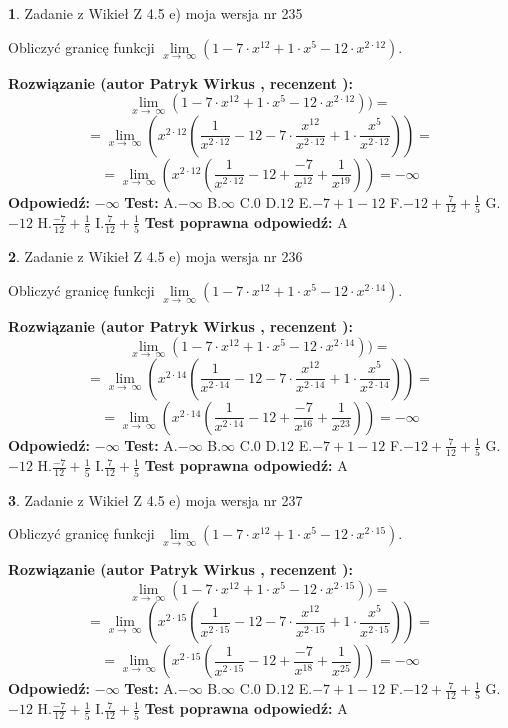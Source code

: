 \documentclass[12pt, a4paper]{article}
\theoremstyle{definition} %
\newtheorem{zad}{}
\newcommand{\zadStart}[1]{\begin{zad}#1\newline}
\newcommand{\zadStop}{\end{zad}}
\newcommand{\rozwStart}[2]{\noindent \textbf{Rozwiązanie (autor #1 , recenzent #2): }\newline}
\newcommand{\rozwStop}{\newline}
\newcommand{\odpStart}{\noindent \textbf{Odpowiedź:}\newline}
\newcommand{\odpStop}{\newline}
\newcommand{\testStart}{\noindent \textbf{Test:}\newline}
\newcommand{\testStop}{\newline}
\newcommand{\kluczStart}{\noindent \textbf{Test poprawna odpowiedź:}\newline}
\newcommand{\kluczStop}{\newline}
\begin{document}
\zadStart{Zadanie z Wikieł Z 4.5 e) moja wersja nr 235}



Obliczyć granicę funkcji  $\lim\limits_{x\to\ \infty}(1 - 7 \cdot x^{12}+1 \cdot x^{5}- 12 \cdot x^{2\cdot12})$.
\zadStop
\rozwStart{Patryk Wirkus}{}
$$\lim\limits_{x\to\ \infty}(1 - 7 \cdot x^{12}+1 \cdot x^{5}- 12 \cdot x^{2\cdot12}))=$$
$$=\lim\limits_{x\to\ \infty}(x^{2\cdot12}(\frac{1}{x^{2\cdot12}}-12 -7 \cdot \frac{x^{12}}{x^{2\cdot12}}+1 \cdot \frac{x^{5}}{x^{2\cdot12}}))=$$
$$=\lim\limits_{x\to\ \infty}(x^{2\cdot12}(\frac{1}{x^{2\cdot12}}-12 + \frac{-7}{x^{12}}+ \frac{1}{x^{19}}))=-\infty$$
\rozwStop
\odpStart
$-\infty$
\odpStop
\testStart
A.$-\infty$ B.$\infty$ C.$0$ D.$12$ E.$-7 + 1 - 12$
F.$-12+\frac{7}{12}+\frac{1}{5}$ G.$-12$
H.$\frac{-7}{12}+\frac{1}{5}$
I.$\frac{7}{12}+\frac{1}{5}$
\testStop
\kluczStart
A
\kluczStop



\zadStart{Zadanie z Wikieł Z 4.5 e) moja wersja nr 236}



Obliczyć granicę funkcji  $\lim\limits_{x\to\ \infty}(1 - 7 \cdot x^{12}+1 \cdot x^{5}- 12 \cdot x^{2\cdot14})$.
\zadStop
\rozwStart{Patryk Wirkus}{}
$$\lim\limits_{x\to\ \infty}(1 - 7 \cdot x^{12}+1 \cdot x^{5}- 12 \cdot x^{2\cdot14}))=$$
$$=\lim\limits_{x\to\ \infty}(x^{2\cdot14}(\frac{1}{x^{2\cdot14}}-12 -7 \cdot \frac{x^{12}}{x^{2\cdot14}}+1 \cdot \frac{x^{5}}{x^{2\cdot14}}))=$$
$$=\lim\limits_{x\to\ \infty}(x^{2\cdot14}(\frac{1}{x^{2\cdot14}}-12 + \frac{-7}{x^{16}}+ \frac{1}{x^{23}}))=-\infty$$
\rozwStop
\odpStart
$-\infty$
\odpStop
\testStart
A.$-\infty$ B.$\infty$ C.$0$ D.$12$ E.$-7 + 1 - 12$
F.$-12+\frac{7}{12}+\frac{1}{5}$ G.$-12$
H.$\frac{-7}{12}+\frac{1}{5}$
I.$\frac{7}{12}+\frac{1}{5}$
\testStop
\kluczStart
A
\kluczStop



\zadStart{Zadanie z Wikieł Z 4.5 e) moja wersja nr 237}



Obliczyć granicę funkcji  $\lim\limits_{x\to\ \infty}(1 - 7 \cdot x^{12}+1 \cdot x^{5}- 12 \cdot x^{2\cdot15})$.
\zadStop
\rozwStart{Patryk Wirkus}{}
$$\lim\limits_{x\to\ \infty}(1 - 7 \cdot x^{12}+1 \cdot x^{5}- 12 \cdot x^{2\cdot15}))=$$
$$=\lim\limits_{x\to\ \infty}(x^{2\cdot15}(\frac{1}{x^{2\cdot15}}-12 -7 \cdot \frac{x^{12}}{x^{2\cdot15}}+1 \cdot \frac{x^{5}}{x^{2\cdot15}}))=$$
$$=\lim\limits_{x\to\ \infty}(x^{2\cdot15}(\frac{1}{x^{2\cdot15}}-12 + \frac{-7}{x^{18}}+ \frac{1}{x^{25}}))=-\infty$$
\rozwStop
\odpStart
$-\infty$
\odpStop
\testStart
A.$-\infty$ B.$\infty$ C.$0$ D.$12$ E.$-7 + 1 - 12$
F.$-12+\frac{7}{12}+\frac{1}{5}$ G.$-12$
H.$\frac{-7}{12}+\frac{1}{5}$
I.$\frac{7}{12}+\frac{1}{5}$
\testStop
\kluczStart
A
\kluczStop
\end{document}
